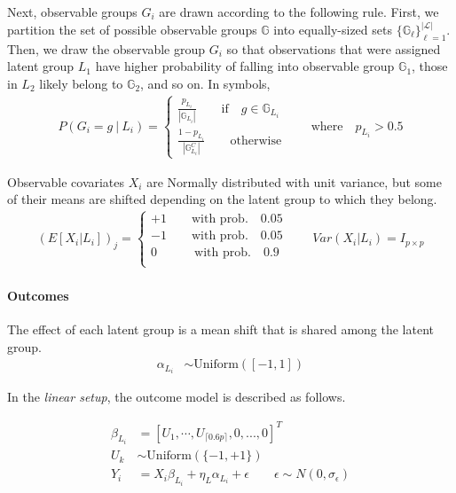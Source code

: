 \documentclass{article}
\theoremstyle{plain}
\theoremstyle{definition}
\theoremstyle{remark}
\begin{document}
\noindent Next, observable groups $G_{i}$ are drawn according to the following rule. First, we partition the set of possible observable groups $\mathbb{G}$ into equally-sized sets $\{\mathbb{G}_{\ell}\}_{\ell=1}^{|\mathcal{L}|}$. Then, we draw the observable group $G_{i}$ so that observations that were assigned latent group $L_{1}$ have higher probability of falling into observable group $\mathbb{G}_{1}$, those in $L_{2}$ likely belong to $\mathbb{G}_{2}$, and so on. In symbols,
\begin{align}
    P(G_{i} = g \ | \ L_{i}) =
        \begin{cases}
            \frac{p_{L_{i}}}{|\mathbb{G}_{L_{i}}|}
            \qquad \text{if}\quad g \in \mathbb{G}_{L_{i}}\\
            \frac{1-p_{L_{i}}}{|\mathbb{G}_{L_{i}}^{C}|} \qquad \text{otherwise}
        \end{cases}
    \qquad
    \text{where} \quad p_{L_{i}} > 0.5
\end{align}

Observable covariates $X_{i}$ are Normally distributed with unit variance, but some of their means are shifted depending on the latent group to which they belong.
\begin{align}
    (E[X_{i} | L_{i}])_{j} = \begin{cases}
        +1 \qquad \text{with prob.}\quad 0.05 \\
        -1 \qquad \text{with prob.}\quad 0.05 \\
        0 \qquad \quad \text{with prob.}\quad 0.9 \\
    \end{cases}
    \qquad
    Var(X_{i}|L_{i}) = I_{p \times p}
\end{align}

\paragraph{Outcomes}
The effect of each latent group is a mean shift that is shared among the latent group.
\begin{align}
    \alpha_{L_{i}} &\sim \text{Uniform}([-1, 1])
\end{align}

\noindent In the \emph{linear setup}, the outcome model is described as follows.

\begin{align}
  \beta_{L_{i}} &= [U_1, \cdots, U_{\lceil 0.6p \rceil}, 0,...,0 ]^{T} \\
  U_{k} &\sim \text{Uniform} (\{ -1, +1 \}) \\
  Y_{i} &= X_{i}\beta_{L_{i}} + \eta_{L}\alpha_{L_i} + \epsilon
  \qquad \epsilon \sim N(0,\sigma_{\epsilon})
  \label{eq:linear_dgp}
\end{align}
\end{document}
